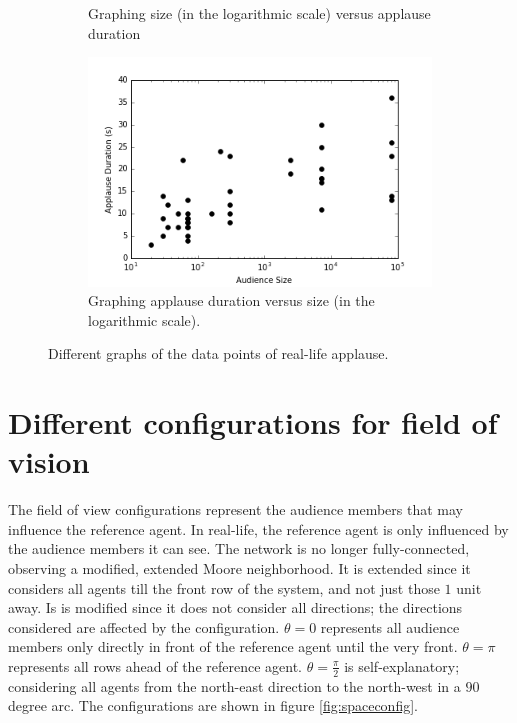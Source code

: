 \begin{figure}[h]
\begin{subfigure}[b]{0.4\linewidth}
    \caption{Graphing size (in the logarithmic scale) versus applause duration}
  \end{subfigure}
    \begin{subfigure}[b]{0.4\linewidth}
    \includegraphics[width=\linewidth]{images/chapter4/4.png}
    \caption{Graphing applause duration versus size (in the logarithmic scale).}
  \end{subfigure}
  \caption{Different graphs of the data points of real-life applause.}
  \label{fig:realclap}
\end{figure}


\section{Different configurations for field of vision}

\hspace{\parindent}The field of view configurations represent the audience members that may influence the reference agent.
In real-life, the  reference agent is only influenced by the audience members it can see.
The network is no longer fully-connected, observing a modified, extended Moore neighborhood.
It is extended since it considers all agents till the front row of the system, and not just those $1$ unit away.
Is is modified since it does not consider all directions; the directions considered are affected by the configuration.
$\theta = 0$ represents all audience members only directly in front of the reference agent until the very front. 
$\theta = \pi$ represents all rows ahead of the reference agent. 
$\theta = \frac{\pi}{2}$ is self-explanatory; considering all agents from the north-east direction to the north-west in a $90$ degree arc. The configurations are shown in figure \ref{fig:spaceconfig}.

